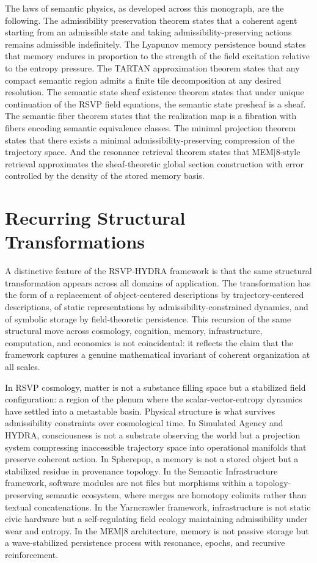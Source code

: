 \documentclass[12pt, a4paper, openany]{book}
\theoremstyle{plain}
\theoremstyle{definition}
\theoremstyle{remark}
\begin{document}
The laws of semantic physics, as developed across this monograph, are the following. The admissibility preservation theorem states that a coherent agent starting from an admissible state and taking admissibility-preserving actions remains admissible indefinitely. The Lyapunov memory persistence bound states that memory endures in proportion to the strength of the field excitation relative to the entropy pressure. The TARTAN approximation theorem states that any compact semantic region admits a finite tile decomposition at any desired resolution. The semantic state sheaf existence theorem states that under unique continuation of the RSVP field equations, the semantic state presheaf is a sheaf. The semantic fiber theorem states that the realization map is a fibration with fibers encoding semantic equivalence classes. The minimal projection theorem states that there exists a minimal admissibility-preserving compression of the trajectory space. And the resonance retrieval theorem states that MEM$|$8-style retrieval approximates the sheaf-theoretic global section construction with error controlled by the density of the stored memory basis.

\section{Recurring Structural Transformations}

A distinctive feature of the RSVP-HYDRA framework is that the same structural transformation appears across all domains of application. The transformation has the form of a replacement of object-centered descriptions by trajectory-centered descriptions, of static representations by admissibility-constrained dynamics, and of symbolic storage by field-theoretic persistence. This recursion of the same structural move across cosmology, cognition, memory, infrastructure, computation, and economics is not coincidental: it reflects the claim that the framework captures a genuine mathematical invariant of coherent organization at all scales.

In RSVP cosmology, matter is not a substance filling space but a stabilized field configuration: a region of the plenum where the scalar-vector-entropy dynamics have settled into a metastable basin. Physical structure is what survives admissibility constraints over cosmological time. In Simulated Agency and HYDRA, consciousness is not a substrate observing the world but a projection system compressing inaccessible trajectory space into operational manifolds that preserve coherent action. In Spherepop, a memory is not a stored object but a stabilized residue in provenance topology. In the Semantic Infrastructure framework, software modules are not files but morphisms within a topology-preserving semantic ecosystem, where merges are homotopy colimits rather than textual concatenations. In the Yarncrawler framework, infrastructure is not static civic hardware but a self-regulating field ecology maintaining admissibility under wear and entropy. In the MEM$|$8 architecture, memory is not passive storage but a wave-stabilized persistence process with resonance, epochs, and recursive reinforcement.
\end{document}
